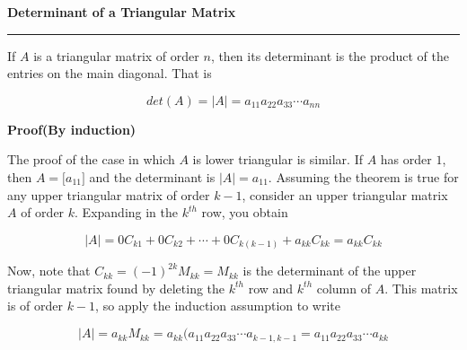 \nopagenumbers
{\bf Determinant of a Triangular Matrix}
\vskip 1mm
\hrule

\vskip 6pt
If  $A$ is a triangular matrix of order $n$, then its determinant is the product of the entries on the main diagonal. That is

$$det(A)=|A|=a_{11}a_{22}a_{33}\cdots a_{nn}$$

\vskip 10pt
{\bf Proof(By induction)}

\vskip 6pt
The proof of the case in which $A$ is lower triangular is similar. If $A$ has order $1$, then $A=\bigl\lbrack a_{11}\bigr\rbrack$ and the determinant is $|A|=a_{11}$. Assuming the theorem is true for any upper triangular matrix of order $k-1$, consider an upper triangular matrix $A$ of order $k$. Expanding in the $k^{th}$ row, you obtain

$$|A|=0C_{k1}+0C_{k2}+\cdots+0C_{k(k-1)}+a_{kk}C_{kk}=a_{kk}C_{kk}$$

Now, note that $C_{kk}=(-1)^{2k}M_{kk}=M_{kk}$ is the determinant of the upper triangular matrix found by deleting the $k^{th}$ row and $k^{th}$ column of $A$. This matrix is of order $k-1$, so apply the induction assumption to write

$$|A|=a_{kk}M_{kk}=a_{kk}(a_{11}a_{22}a_{33}\cdots a_{k-1,k-1}=a_{11}a_{22}a_{33}\cdots a_{kk}$$

\vfill\eject
\bye
